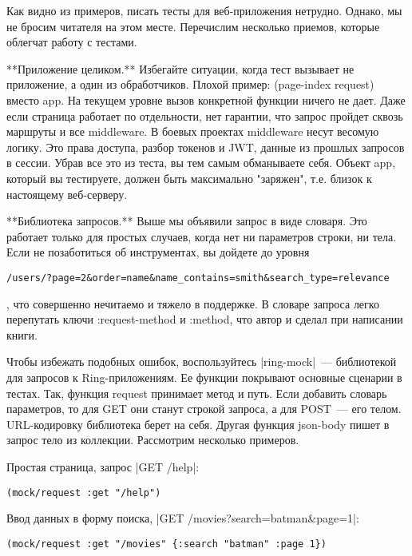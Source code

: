 Как видно из примеров, писать тесты для веб-приложения нетрудно. Однако, мы не
бросим читателя на этом месте. Перечислим несколько приемов, которые облегчат
работу с тестами.

**Приложение целиком.** Избегайте ситуации, когда тест вызывает не приложение, а
один из обработчиков. Плохой пример: (page-index request) вместо app. На текущем
уровне вызов конкретной функции ничего не дает. Даже если страница работает по
отдельности, нет гарантии, что запрос пройдет сквозь маршруты и все
middleware. В боевых проектах middleware несут весомую логику. Это права
доступа, разбор токенов и JWT, данные из прошлых запросов в сессии. Убрав все
это из теста, вы тем самым обманываете себя. Объект app, который вы тестируете,
должен быть максимально "заряжен", т.е. близок к настоящему веб-серверу.

**Библиотека запросов.** Выше мы объявили запрос в виде словаря. Это работает
только для простых случаев, когда нет ни параметров строки, ни тела. Если не
позаботиться об инструментах, вы дойдете до уровня

\begin{verbatim}
/users/?page=2&order=name&name_contains=smith&search_type=relevance
\end{verbatim}

, что совершенно нечитаемо и тяжело в поддержке. В словаре запроса легко
перепутать ключи :request-method и :method, что автор и сделал при написании
книги.

Чтобы избежать подобных ошибок, воспользуйтесь \spverb|ring-mock|~--- библиотекой для
запросов к Ring-приложениям. Ее функции покрывают основные сценарии в
тестах. Так, функция request принимает метод и путь. Если добавить словарь
параметров, то для GET они станут строкой запроса, а для POST~--- его
телом. URL-кодировку библиотека берет на себя. Другая функция json-body пишет в
запрос тело из коллекции. Рассмотрим несколько примеров.

Простая страница, запрос \spverb|GET /help|:

\begin{verbatim}
(mock/request :get "/help")
\end{verbatim}

Ввод данных в форму поиска, \spverb|GET /movies?search=batman&page=1|:

\begin{verbatim}
(mock/request :get "/movies" {:search "batman" :page 1})
\end{verbatim}

